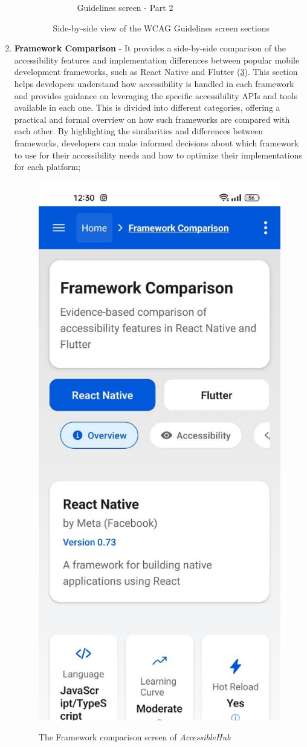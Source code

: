 \begin{enumerate}
\begin{itemize}
\begin{figure}[ht]
\begin{subfigure}[b]{0.48\textwidth}
                \caption{Guidelines screen - Part 2}
                \label{fig:guidelines-right}
            \end{subfigure}
            \caption{Side-by-side view of the WCAG Guidelines screen sections}
            \label{fig:guidelines_screens_sidebyside}
        \end{figure}

        \FloatBarrier
        
    \end{itemize}

\item \textbf{Framework Comparison} - It provides a side-by-side comparison of the accessibility features and implementation differences between popular mobile development frameworks, such as React Native and Flutter (\ref{fig:frameworks-comparison}). This section helps developers understand how accessibility is handled in each framework and provides guidance on leveraging the specific accessibility APIs and tools available in each one. This is divided into different categories, offering a practical and formal overview on how such frameworks are compared with each other. By highlighting the similarities and differences between frameworks, developers can make informed decisions about which framework to use for their accessibility needs and how to optimize their implementations for each platform;

\begin{figure}[ht]
\centering
\includegraphics[width=0.4\linewidth, alt={Screenshot of the Framework comparison screen of AccessibleHub}]{img/frameworks-comparison.jpg}
\caption{The Framework comparison screen of \textit{AccessibleHub}}\label{fig:frameworks-comparison}
\end{figure}


\end{enumerate}

